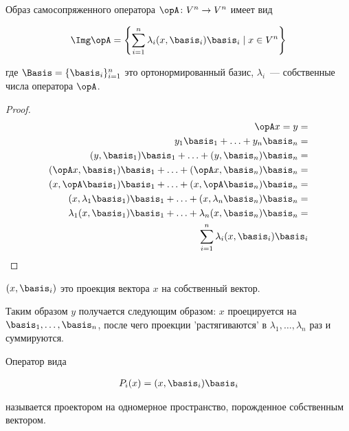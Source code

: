 
\begin{theorem}\label{sconj-lo-img}
  Образ самосопряженного оператора \(\opA \colon V^{n} \to V^{n}\) имеет вид

  \begin{align*}
    \Img \opA = \left\{
      \sum_{i = 1}^{n}
      \lambda_{i} (x, \basis_{i}) \basis_{i}
      \mid x \in V^{n}
    \right\}
  \end{align*}

  где \(\Basis = \{ \basis_{i} \}_{i = 1}^{n}\) это ортонормированный базис,
  \(\lambda_{i}\)~--- собственные числа оператора \(\opA\).
\end{theorem}
\begin{proof}
  \begin{align*}
    \opA x = y =
    \\
      y_{1} \basis_{1}
        + \dotsc + y_{n} \basis_{n} =
    \\
      (y, \basis_{1}) \basis_{1}
        + \dotsc + (y, \basis_{n}) \basis_{n} =
    \\
      (\opA x, \basis_{1}) \basis_{1}
        + \dotsc + (\opA x, \basis_{n}) \basis_{n} =
    \\
      (x, \opA \basis_{1}) \basis_{1}
        + \dotsc + (x, \opA \basis_{n}) \basis_{n} =
    \\
      (x, \lambda_{1} \basis_{1}) \basis_{1}
        + \dotsc + (x, \lambda_{n} \basis_{n}) \basis_{n} =
    \\
      \lambda_{1} (x, \basis_{1}) \basis_{1}
        + \dotsc + \lambda_{n} (x,\basis_{n}) \basis_{n} =
    \\
    \sum_{i = 1}^{n} \lambda_{i} (x, \basis_{i}) \basis_{i}
  \end{align*}
\end{proof}

\begin{remark}
  \((x, \basis_{i})\) это проекция вектора \(x\) на собственный вектор.

  Таким образом \(y\) получается следующим образом: \(x\) проецируется на 
  \(\basis_{1}, \dotsc, \basis_{n}\), после чего проекции 'растягиваются' в
  \(\lambda_{1}, \dotsc, \lambda_{n}\) раз и суммируются.
\end{remark}

\begin{definition}\label{lo-proj}
  Оператор вида

  \begin{align*}
    P_{i}(x) = (x, \basis_{i}) \basis_{i}
  \end{align*}

  называется проектором на одномерное пространство, порожденное собственным
  вектором.
\end{definition}

